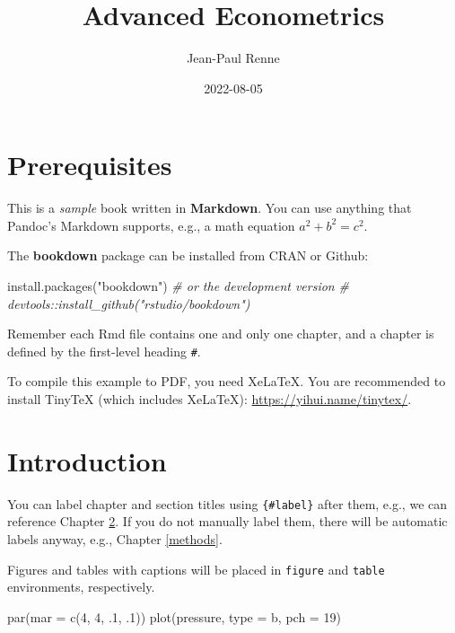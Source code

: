 \documentclass[
]{book}
\title{Advanced Econometrics}
\author{Jean-Paul Renne}
\date{2022-08-05}
\newenvironment{Shaded}{\begin{snugshade}}{\end{snugshade}}
\newcommand{\AttributeTok}[1]{\textcolor[rgb]{0.77,0.63,0.00}{#1}}
\newcommand{\CommentTok}[1]{\textcolor[rgb]{0.56,0.35,0.01}{\textit{#1}}}
\newcommand{\DecValTok}[1]{\textcolor[rgb]{0.00,0.00,0.81}{#1}}
\newcommand{\FunctionTok}[1]{\textcolor[rgb]{0.00,0.00,0.00}{#1}}
\newcommand{\NormalTok}[1]{#1}
\newcommand{\StringTok}[1]{\textcolor[rgb]{0.31,0.60,0.02}{#1}}
\theoremstyle{definition}
\theoremstyle{definition}
\theoremstyle{definition}
\theoremstyle{definition}
\theoremstyle{remark}
\begin{document}
\maketitle

{
\setcounter{tocdepth}{1}
\tableofcontents
}
\newcommand{\bv}[1]{\mathbf{#1}}

\hypertarget{prerequisites}{%
\chapter{Prerequisites}\label{prerequisites}}

This is a \emph{sample} book written in \textbf{Markdown}. You can use anything that Pandoc's Markdown supports, e.g., a math equation \(a^2 + b^2 = c^2\).

The \textbf{bookdown} package can be installed from CRAN or Github:

\begin{Shaded}
\begin{Highlighting}[]
\FunctionTok{install.packages}\NormalTok{(}\StringTok{"bookdown"}\NormalTok{)}
\CommentTok{\# or the development version}
\CommentTok{\# devtools::install\_github("rstudio/bookdown")}
\end{Highlighting}
\end{Shaded}

Remember each Rmd file contains one and only one chapter, and a chapter is defined by the first-level heading \texttt{\#}.

To compile this example to PDF, you need XeLaTeX. You are recommended to install TinyTeX (which includes XeLaTeX): \url{https://yihui.name/tinytex/}.

\hypertarget{intro}{%
\chapter{Introduction}\label{intro}}

You can label chapter and section titles using \texttt{\{\#label\}} after them, e.g., we can reference Chapter \ref{intro}. If you do not manually label them, there will be automatic labels anyway, e.g., Chapter \ref{methods}.

Figures and tables with captions will be placed in \texttt{figure} and \texttt{table} environments, respectively.

\begin{Shaded}
\begin{Highlighting}[]
\FunctionTok{par}\NormalTok{(}\AttributeTok{mar =} \FunctionTok{c}\NormalTok{(}\DecValTok{4}\NormalTok{, }\DecValTok{4}\NormalTok{, .}\DecValTok{1}\NormalTok{, .}\DecValTok{1}\NormalTok{))}
\FunctionTok{plot}\NormalTok{(pressure, }\AttributeTok{type =} \StringTok{\textquotesingle{}b\textquotesingle{}}\NormalTok{, }\AttributeTok{pch =} \DecValTok{19}\NormalTok{)}
\end{Highlighting}
\end{Shaded}
\end{document}
